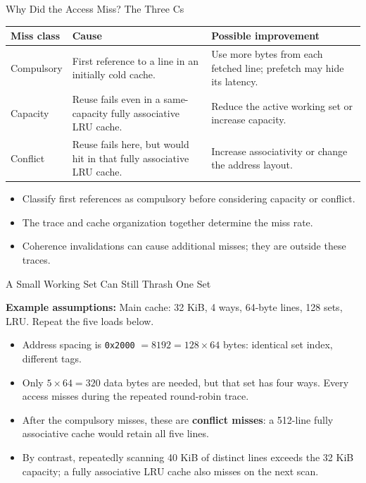 \documentclass[aspectratio=169,11pt,t]{beamer}
\newcommand{\key}[1]{\textbf{#1}}
\newcommand{\hex}[1]{\texttt{0x#1}}
\newcommand{\Model}[1]{\par{\scriptsize\color{deepblue}\textbf{Example assumptions:} #1\par}\vspace{.14cm}}
\begin{document}
\begin{frame}{Why Did the Access Miss? The Three Cs}
\small
\renewcommand{\arraystretch}{1.18}
\begin{tabular}{R{2.7cm}R{5.8cm}R{4.5cm}}
\toprule
\textbf{Miss class} & \textbf{Cause} & \textbf{Possible improvement}\\
\midrule
Compulsory & First reference to a line in an initially cold cache. & Use more bytes from each fetched line; prefetch may hide its latency.\\
Capacity & Reuse fails even in a same-capacity fully associative LRU cache. & Reduce the active working set or increase capacity.\\
Conflict & Reuse fails here, but would hit in that fully associative LRU cache. & Increase associativity or change the address layout.\\
\bottomrule
\end{tabular}\par
\vspace{.22cm}
\begin{itemize}\setlength{\itemsep}{4pt}
  \item Classify first references as compulsory before considering capacity or conflict.
  \item The trace and cache organization together determine the miss rate.
  \item Coherence invalidations can cause additional misses; they are outside these traces.
\end{itemize}
\end{frame}

\begin{frame}{A Small Working Set Can Still Thrash One Set}
\small
\Model{Main cache: 32 KiB, 4 ways, 64-byte lines, 128 sets, LRU. Repeat the five loads below.}
\begin{center}
\end{center}
\begin{itemize}\setlength{\itemsep}{6pt}
  \item Address spacing is \hex{2000} \(=8192=128\times64\) bytes: identical set index, different tags.
  \item Only \(5\times64=320\) data bytes are needed, but that set has four ways. Every access misses during the repeated round-robin trace.
  \item After the compulsory misses, these are \key{conflict misses}: a 512-line fully associative cache would retain all five lines.
  \item By contrast, repeatedly scanning 40 KiB of distinct lines exceeds the 32 KiB capacity; a fully associative LRU cache also misses on the next scan.
\end{itemize}
\end{frame}
\end{document}
